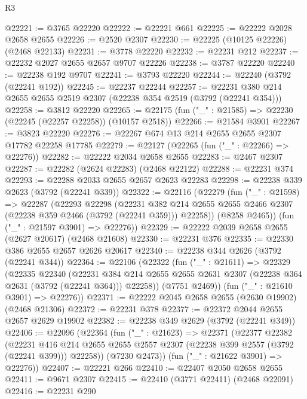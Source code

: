 \begin{lexlean}{R3}
\begin{coremodule}
@22221 := @3765 @22220
@22222 := @22221 @661
@22225 := @22222 @2028 @2658 @2655
@22226 := @2520 @2307
@22230 := @22225 (@10125 @22226) (@2468 @22133)
@22231 := @3778 @22220
@22232 := @22231 @212
@22237 := @22232 @2027 @2655 @2657 @9707 @22226
@22238 := @3787 @22220
@22240 := @22238 @192 @9707
@22241 := @3793 @22220
@22244 := @22240 (@3792 (@22241 @192))
@22245 := @22237 @22244
@22257 := @22231 @380 @214 @2655 @2655 @2519 @2307 (@22238 @354 @2519 (@3792 (@22241 @354)))
@22258 := @3812 @22220
@22265 := @22175 (fun ("_" : @21585) => @22230 (@22245 (@22257 @22258)) (@10157 @2518))
@22266 := @21584 @3901
@22267 := @3823 @22220
@22276 := @22267 @674 @13 @214 @2655 @2655 @2307 @17782 @22258 @17785
@22279 := @22127 (@22265 (fun ("_" : @22266) => @22276))
@22282 := @22222 @2034 @2658 @2655
@22283 := @2467 @2307
@22287 := @22282 (@2624 @22283) (@2468 @22122)
@22288 := @22231 @374
@22293 := @22288 @2033 @2655 @2657 @2623 @22283
@22298 := @22238 @339 @2623 (@3792 (@22241 @339))
@22322 := @22116
    (@22279
      (fun ("_" : @21598) =>
      @22287
        (@22293
          @22298
          (@22231
            @382
            @214
            @2655
            @2655
            @2466
            @2307
            (@22238 @359 @2466 (@3792 (@22241 @359)))
            @22258))
        (@8258 @2465))
      (fun ("_" : @21597 @3901) => @22276))
@22329 := @22222 @2039 @2658 @2655 (@2627 @20617) (@2468 @21608)
@22330 := @22231 @376
@22335 := @22330 @386 @2655 @2657 @2626 @20617
@22340 := @22238 @344 @2626 (@3792 (@22241 @344))
@22364 := @22106
    (@22322
      (fun ("_" : @21611) =>
      @22329
        (@22335
          @22340
          (@22231
            @384
            @214
            @2655
            @2655
            @2631
            @2307
            (@22238 @364 @2631 (@3792 (@22241 @364)))
            @22258))
        (@7751 @2469))
      (fun ("_" : @21610 @3901) => @22276))
@22371 := @22222 @2045 @2658 @2655 (@2630 @19902) (@2468 @21306)
@22372 := @22231 @378
@22377 := @22372 @2044 @2655 @2657 @2629 @19902
@22382 := @22238 @349 @2629 (@3792 (@22241 @349))
@22406 := @22096
    (@22364
      (fun ("_" : @21623) =>
      @22371
        (@22377
          @22382
          (@22231
            @416
            @214
            @2655
            @2655
            @2557
            @2307
            (@22238 @399 @2557 (@3792 (@22241 @399)))
            @22258))
        (@7230 @2473))
      (fun ("_" : @21622 @3901) => @22276))
@22407 := @22221 @266
@22410 := @22407 @2050 @2658 @2655
@22411 := @9671 @2307
@22415 := @22410 (@3771 @22411) (@2468 @22091)
@22416 := @22231 @290

\end{coremodule}
\end{lexlean}
